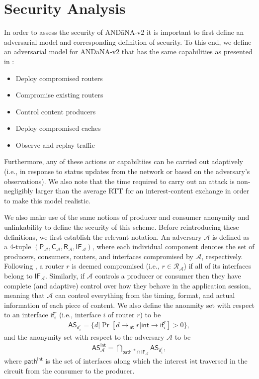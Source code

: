 \section{Security Analysis} \label{sec:security}
In order to assess the security of {\sf AND\=aNA-v2} it is important to first define an adversarial model and corresponding definition of security. To this end, we define an adversarial model for {\sf AND\=aNA-v2} that has the same capabilities as presented in \cite{andana}:
\begin{itemize}
	\item Deploy compromised routers
	\item Compromise existing routers
	\item Control content producers
	\item Deploy compromised caches
	\item Observe and replay traffic
\end{itemize}
Furthermore, any of these actions or capabiltiies can be carried out adaptively (i.e., in response to status updates from the network or based on the adversary's observations). We also note that the time required to carry out an attack is non-negligibly larger than the average RTT for an interest-content exchange in order to make this model realistic. 

We also make use of the same notions of producer and consumer anonymity and unlinkability to define the security of this scheme. Before reintroducing these definitions, we first establish the relevant notation. An adversary $\mathcal{A}$ is defined as a 4-tuple $(\mathsf{P}_{\mathcal{A}}, \mathsf{C}_{\mathcal{A}}, \mathsf{R}_{\mathcal{A}}, \mathsf{IF}_{\mathcal{A}})$, where each individual component denotes the set of producers, consumers, routers, and interfaces compromised by $\mathcal{A}$, respectively. Following \cite{andana}, a router $r$ is deemed compromised (i.e., $r \in \mathcal{R}_{\mathcal{A}}$) if all of its interfaces belong to $\mathsf{IF}_{\mathcal{A}}$. Similarly, if $\mathcal{A}$ controls a producer or consumer then they have complete (and adaptive) control over how they behave in the application session, meaning that $\mathcal{A}$ can control everything from the timing, format, and actual information of each piece of content. We also define the anonmity set with respect to an interface $\mathsf{if}_i^r$ (i.e., interface $i$ of router $r$) to be 
\begin{align*}
\mathsf{AS}_{\mathsf{if}_{i}^{r}} = \{d | \Pr[d \to_\mathsf{int} r | \mathsf{int} \to \mathsf{if}_i^r] > 0 \},
\end{align*}
and the anonymity set with respect to the adversary $\mathcal{A}$ to be
\begin{align*}
\mathsf{AS}_{\mathcal{A}}^{\mathsf{int}} = \bigcap_{\mathsf{path}^{\mathsf{int}} \cap \mathsf{IF}_{\mathcal{A}}} \mathsf{AS}_{\mathsf{if}_{i}^{r}},
\end{align*}
where $\mathsf{path}^{\mathsf{int}}$ is the set of interfaces along which the interest $\mathsf{int}$ traversed in the circuit from the consumer to the producer. 

